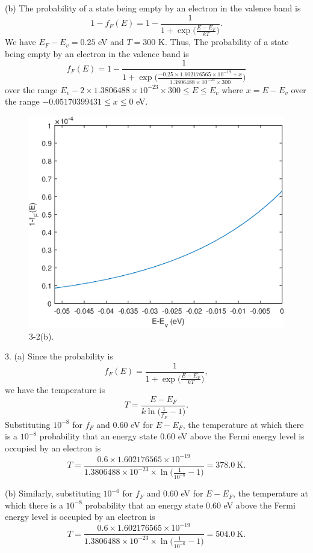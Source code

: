 \documentclass[a4paper]{article}
\begin{document}
(b) The probability of a state being empty by an electron in the valence band is
$$1-f_F(E)=1-\frac{1}{1+\exp{\big(\frac{E-E_F}{kT}\big)}}.$$
We have $E_F-E_v=0.25$ eV and $T=300$ K. Thus, The probability of a state being empty by an electron in the valence band is
$$f_F(E)=1-\frac{1}{1+\exp{\big(\frac{-0.25\times1.602176565\times10^{-19}+x}{1.3806488\times10^{-23}\times300}\big)}}$$
over the range $E_v-2\times1.3806488\times10^{-23}\times300\leq E\leq E_v$ where $x=E-E_v$ over the range $-0.05170399431\leq x\leq0$ eV.
\begin{figure}[H]
    \centering
    \includegraphics[width=1\textwidth]{3-2(b).eps}
    \caption{3-2(b).}
\end{figure}

3. (a) Since the probability is
$$f_F(E)=\frac{1}{1+\exp{\big(\frac{E-E_F}{kT}\big)}},$$
we have the temperature is
$$T=\frac{E-E_F}{k\ln{(\frac{1}{f_F}-1})}.$$
Substituting $10^{-8}$ for $f_F$ and $0.60$ eV for $E-E_F$, the temperature at which there is a $10^{-8}$ probability that an energy state 0.60 eV above the Fermi energy level is occupied by an electron is
$$T=\frac{0.6\times1.602176565\times10^{-19}}{1.3806488\times10^{-23}\times\ln{(\frac{1}{10^{-8}}-1})}=378.0\ \text{K}.$$

(b) Similarly, substituting $10^{-6}$ for $f_F$ and $0.60$ eV for $E-E_F$, the temperature at which there is a $10^{-8}$ probability that an energy state 0.60 eV above the Fermi energy level is occupied by an electron is
$$T=\frac{0.6\times1.602176565\times10^{-19}}{1.3806488\times10^{-23}\times\ln{(\frac{1}{10^{-6}}-1})}=504.0\ \text{K}.$$
\end{document}
